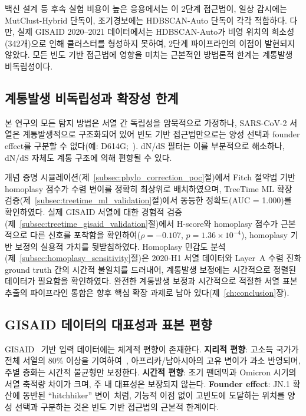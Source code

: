 백신 설계 등 후속 실험 비용이 높은 응용에서는 이 2단계 접근법이, 일상 감시에는 MutClust-Hybrid 단독이, 조기경보에는 HDBSCAN-Auto 단독이 각각 적합하다.
다만, 실제 GISAID 2020--2021 데이터에서는 HDBSCAN-Auto가 비영 위치의 희소성(342개)으로 인해 클러스터를 형성하지 못하여, 2단계 파이프라인의 이점이 발현되지 않았다.
모든 빈도 기반 접근법에 영향을 미치는 근본적인 방법론적 한계는 계통발생 비독립성이다.

\subsection{계통발생 비독립성과 확장성 한계}
\label{sec:phylo_limits}

본 연구의 모든 탐지 방법은 서열 간 독립성을 암묵적으로 가정하나, SARS-CoV-2 서열은 계통발생적으로 구조화되어 있어 빈도 기반 접근법만으로는 양성 선택과 founder effect를 구분할 수 없다(예: D614G;~\cite{korber2020tracking}).
dN/dS 필터는 이를 부분적으로 해소하나, dN/dS 자체도 계통 구조에 의해 편향될 수 있다.

개념 증명 시뮬레이션(제~\ref{subsec:phylo_correction_poc}절)에서 Fitch 절약법 기반 homoplasy 점수가 수렴 변이를 정확히 최상위로 배치하였으며, TreeTime ML 확장 검증(제~\ref{subsec:treetime_ml_validation}절)에서 동등한 정확도(AUC = 1.000)를 확인하였다.
실제 GISAID 서열에 대한 경험적 검증(제~\ref{subsec:treetime_gisaid_validation}절)에서 H-score와 homoplasy 점수가 근본적으로 다른 신호를 포착함을 확인하여($\rho = -0.107$, $p = 1.36 \times 10^{-4}$), homoplasy 기반 보정의 실용적 가치를 뒷받침하였다.
Homoplasy 민감도 분석(제~\ref{subsec:homoplasy_sensitivity}절)은 2020-H1 서열 데이터와 Layer~A 수렴 진화 ground truth 간의 시간적 불일치를 드러내어, 계통발생 보정에는 시간적으로 정렬된 데이터가 필요함을 확인하였다.
완전한 계통발생 보정과 시간적으로 적절한 서열 표본 추출의 파이프라인 통합은 향후 핵심 확장 과제로 남아 있다(제~\ref{ch:conclusion}장).

\subsection{GISAID 데이터의 대표성과 표본 편향}

GISAID~\cite{shu2017gisaid} 기반 입력 데이터에는 체계적 편향이 존재한다.
\textbf{지리적 편향}: 고소득 국가가 전체 서열의 80\% 이상을 기여하여~\cite{chen2022gisaid}, 아프리카/남아시아의 고유 변이가 과소 반영되며, 주별 층화는 시간적 불균형만 보정한다.
\textbf{시간적 편향}: 초기 팬데믹과 Omicron 시기의 서열 축적량 차이가 크며, 주 내 대표성은 보장되지 않는다.
\textbf{Founder effect}: JN.1 확산에 동반된 ``hitchhiker'' 변이~\cite{kaku2024virological}처럼, 기능적 이점 없이 고빈도에 도달하는 위치를 양성 선택과 구분하는 것은 빈도 기반 접근법의 근본적 한계이다.

